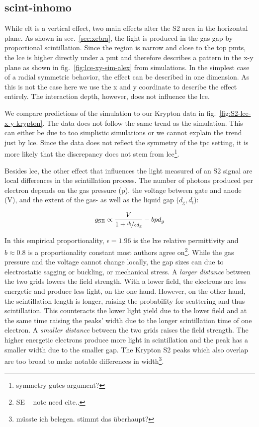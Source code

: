 
\FloatBarrier
\subsection{scint-inhomo}
\label{ssec:scint-inhomo}
\FloatBarrier


While \gls{elt} is a vertical effect, two main effects alter the S2 area in the horizontal plane.
As shown in sec.~\ref{sec:xebra}, the light is produced in the gas gap by proportional scintillation.
Since the region is narrow and close to the top \glspl{pmt}, the \gls{lce} is higher directly under a \gls{pmt} and therefore describes a pattern in the x-y plane as shown in fig.~\ref{fig:lce-xy-sim-alex} from simulations.
In the simplest case of a radial symmetric behavior, the effect can be described in one dimension.
As this is not the case here we use the x and y coordinate to describe the effect entirely.
The interaction depth, however, does not influence the \gls{lce}.

We compare predictions of the simulation to our Krypton data in fig.~\ref{fig:S2-lce-x-y-krypton}.  %
The data does not follow the same trend as the simulation.
This can either be due to too simplistic simulations or we cannot explain the trend just by \gls{lce}.
Since the data does not reflect the symmetry of the \gls{tpc} setting, it is more likely that the discrepancy does not stem from \gls{lce}\footnote{symmetry gutes argument?}.

Besides \gls{lce}, the other effect that influences the light measured of an S2 signal are local differences in the scintillation process.
The number of photons produced per electron depends on the gas pressure (p), the voltage between gate and anode (V), and the extent of the gas- as well as the liquid gap ($ d_\mathrm{g}, d_\mathrm{l}$):

\begin{equation}
    g_\mathrm{SE} \propto \frac{V}{1 + \nicefrac{d_\mathrm{l}}{\epsilon d_\mathrm{g}} }- bpd_g
\end{equation}

In this empirical proportionality, $ \epsilon = 1.96 $ is the \gls{lxe} relative permittivity and $ b \approx 0.8 $ is a proportionality constant most authors agree on\footnote{SE \oneton~ note need cite..}.  %
While the gas pressure and the voltage cannot change locally, the gap sizes can due to electrostatic sagging or buckling, or mechanical stress.
A \emph{larger distance} between the two grids lowers the field strength.
With a lower field, the electrons are less energetic and produce less light, on the one hand.
However, on the other hand, the scintillation length is longer, raising the probability for scattering and thus scintillation.
This counteracts the lower light yield due to the lower field and at the same time raising the peaks' width due to the longer scintillation time of one electron.
A \emph{smaller distance} between the two grids raises the field strength.
The higher energetic electrons produce more light in scintillation and the peak has a smaller width due to the smaller gap.
The Krypton S2 peaks which also overlap are too broad to make notable differences in width\footnote{müsste ich belegen. stimmt das überhaupt?}.

